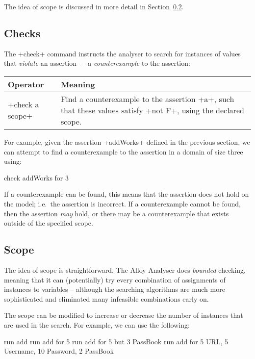 The idea of scope is discussed in more detail in Section~\ref{sec:specification:analyser:scope}.

\subsection{Checks}

The \A+check+ command instructs the analyser to search for instances of values that \emph{violate} an assertion --- a \emph{counterexample} to the assertion:
\begin{center}
\begin{tabular}{lp{12.5cm}}
\toprule
 Operator & Meaning\\
\midrule
 \A+check a scope+ & Find a counterexample to the assertion \A+a+, such that these values satisfy \A+not F+, using the declared scope.\\
\bottomrule
\end{tabular}
\end{center}

For example, given the assertion \A+addWorks+ defined in the previous section, we can attempt to find a counterexample to the assertion in a domain of size three using:

\begin{alloy}
check addWorks for 3
\end{alloy}

If a counterexample can be found, this means that the assertion does not hold on the model; i.e.\ the assertion is incorrect. If a counterexample cannot be found, then the assertion \emph{may} hold, or there may be a counterexample that exists outside of the specified scope.

\subsection{Scope}
\label{sec:specification:analyser:scope}

 The idea of scope is straightforward. The Alloy Analyser does \emph{bounded} checking, meaning that it can (potentially) try every combination of assignments of instances to variables -- although the searching algorithms are much more sophisticated and eliminated many infeasible combinations early on.

The scope can be modified to increase or decrease the number of instances that are used in the search. For example, we can use the following:

\begin{alloy}
run add
run add for 5
run add for 5 but 3 PassBook
run add for 5 URL, 5 Username, 10 Password, 2 PassBook
\end{alloy}

